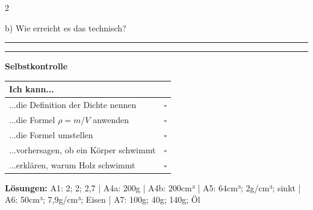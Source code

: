 \documentclass[10pt, a4paper]{article}
\newcommand{\fachfarbe}{physik}
\newcommand{\luecke}[1]{\rule{#1}{0.4pt}}
\newcommand{\abschnitt}[1]{%
    \vspace{6pt}
    \noindent\textbf{\textcolor{\fachfarbe}{#1}}
    \vspace{3pt}
}
\begin{document}
\begin{multicols}{2}
\vspace{5pt}

b) Wie erreicht es das technisch?

\vspace{2pt}
\luecke{5cm}

\vspace{2pt}
\luecke{5cm}

\vspace{12pt}


\abschnitt{Selbstkontrolle}

\begin{tabular}{|p{4.5cm}|c|}
\hline
\textbf{Ich kann...} & \\
\hline
...die Definition der Dichte nennen & $\square$ \\
\hline
...die Formel $\rho = m/V$ anwenden & $\square$ \\
\hline
...die Formel umstellen & $\square$ \\
\hline
...vorhersagen, ob ein Körper schwimmt & $\square$ \\
\hline
...erklären, warum Holz schwimmt & $\square$ \\
\hline
\end{tabular}

\vspace{10pt}


{\scriptsize\textcolor{grau}{
\textbf{Lösungen:}
A1: 2; 2; 2,7 |
A4a: 200g | A4b: 200cm³ |
A5: 64cm³; 2g/cm³; sinkt |
A6: 50cm³; 7,9g/cm³; Eisen |
A7: 100g; 40g; 140g; Öl
}}

\end{multicols}
\end{document}
